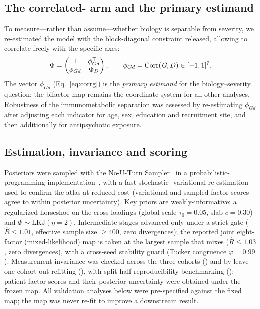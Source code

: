 \subsection{The correlated-\texorpdfstring{\Gfac}{G} arm and the primary estimand}
To measure---rather than assume---whether biology is separable from severity, we re-estimated the
model with the block-diagonal constraint released, allowing \Gfac{} to correlate freely with the
specific axes:
\begin{equation}
\Phi=\begin{pmatrix}1 & \phi_{Gd}^{\top}\\ \phi_{Gd} & \Phi_D\end{pmatrix},\qquad
\phi_{Gd}=\operatorname{Corr}(\textit{G},D)\in[-1,1]^{7}.
\label{eq:corrg}
\end{equation}
The vector $\phi_{Gd}$ (Eq.~\ref{eq:corrg}) is the \emph{primary estimand} for the biology--severity
question; the bifactor map remains the coordinate system for all other analyses. Robustness of the
immunometabolic separation was assessed by re-estimating $\phi_{Gd}$ after adjusting each indicator
for age, sex, education and recruitment site, and then additionally for antipsychotic exposure.

\subsection{Estimation, invariance and scoring}
Posteriors were sampled with the No-U-Turn Sampler~\citep{hoffman2014nuts} in a probabilistic-%
programming implementation~\citep{abrilpla2023pymc,phan2019numpyro}, with a fast stochastic-%
variational re-estimation~\citep{blei2017vi,hoffman2013svi,kingma2014vae} used to confirm the atlas
at reduced cost (variational and sampled factor scores agree to within posterior uncertainty). Key
priors are weakly-informative: a regularized-horseshoe on the cross-loadings (global scale
$\tau_0=0.05$, slab $c=0.30$) and $\Phi\sim\mathrm{LKJ}(\eta{=}2)$. Intermediate stages advanced only
under a strict gate ($\hat R\le1.01$, effective sample size $\ge400$, zero divergences); the reported
joint eight-factor (mixed-likelihood) map is taken at the largest sample that mixes
($\hat R\le1.03$, zero divergences), with a cross-seed stability guard (Tucker congruence $\varphi=0.99$).
Measurement invariance was checked across the three cohorts () and by
leave-one-cohort-out refitting (), with split-half reproducibility benchmarking
(); patient factor scores and their posterior uncertainty were obtained under
the frozen map. All validation analyses below were pre-specified against the fixed map;
the map was never re-fit to improve a downstream result.


